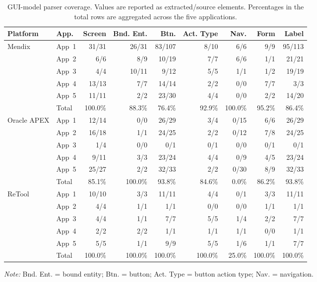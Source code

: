 \begin{table}[t]
\centering
\caption{GUI-model parser coverage. Values are reported as extracted/source
elements. Percentages in the total rows are aggregated across the five applications.}
\label{tab:parser-gui-model}
\scriptsize
\setlength{\tabcolsep}{3.5pt}
\renewcommand{\arraystretch}{1.08}
\begin{tabular}{llrrrrrrr}
\toprule
Platform & App. & Screen & Bnd. Ent. & Btn. & Act. Type & Nav. & Form & Label \\
\midrule
\multirow{6}{*}{Mendix}
& App~1 & 31/31 & 26/31 & 83/107 & 8/10 & 6/6 & 9/9 & 95/113 \\
& App~2 & 6/6 & 8/9 & 10/19 & 7/7 & 6/6 & 1/1 & 21/21 \\
& App~3 & 4/4 & 10/11 & 9/12 & 5/5 & 1/1 & 1/2 & 19/19 \\
& App~4 & 13/13 & 7/7 & 14/14 & 2/2 & 0/0 & 7/7 & 3/3 \\
& App~5 & 11/11 & 2/2 & 23/30 & 4/4 & 0/0 & 2/2 & 14/20 \\
& Total & 100.0\% & 88.3\% & 76.4\% & 92.9\% & 100.0\% & 95.2\% & 86.4\% \\
\midrule
\multirow{6}{*}{Oracle APEX}
& App~1 & 12/14 & 0/0 & 26/29 & 3/4 & 0/15 & 6/6 & 26/29 \\
& App~2 & 16/18 & 1/1 & 24/25 & 2/2 & 0/12 & 7/8 & 24/25 \\
& App~3 & 1/4 & 0/0 & 0/1 & 0/1 & 0/0 & 0/1 & 0/1 \\
& App~4 & 9/11 & 3/3 & 23/24 & 4/4 & 0/9 & 4/5 & 23/24 \\
& App~5 & 25/27 & 2/2 & 32/33 & 2/2 & 0/30 & 8/9 & 32/33 \\
& Total & 85.1\% & 100.0\% & 93.8\% & 84.6\% & 0.0\% & 86.2\% & 93.8\% \\
\midrule
\multirow{6}{*}{ReTool}
& App~1 & 10/10 & 3/3 & 11/11 & 4/4 & 0/1 & 3/3 & 11/11 \\
& App~2 & 4/4 & 1/1 & 1/1 & 0/0 & 0/0 & 1/1 & 1/1 \\
& App~3 & 4/4 & 1/1 & 7/7 & 5/5 & 1/4 & 2/2 & 7/7 \\
& App~4 & 2/2 & 2/2 & 1/1 & 1/1 & 1/1 & 0/0 & 1/1 \\
& App~5 & 5/5 & 1/1 & 9/9 & 5/5 & 1/6 & 1/1 & 7/7 \\
& Total & 100.0\% & 100.0\% & 100.0\% & 100.0\% & 25.0\% & 100.0\% & 100.0\% \\
\bottomrule
\end{tabular}
\vspace{0.3em}
\begin{minipage}{0.96\textwidth}
\footnotesize
\textit{Note:} Bnd. Ent. = bound entity; Btn. = button;
Act. Type = button action type; Nav. = navigation.
\end{minipage}
\end{table}
